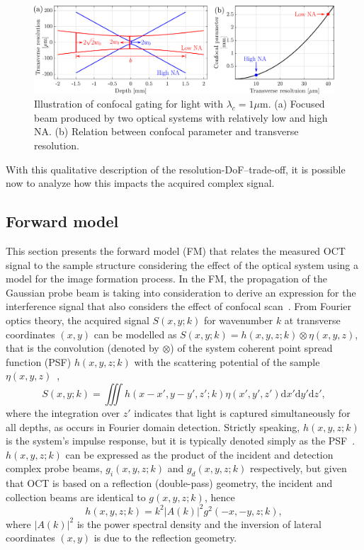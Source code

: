 \begin{figure}[htb!]
    \centering
    \includegraphics[width=\textwidth]{Figures/TheoreticalBasis/ConfocalScan.pdf}
    \caption[Illustration of confocal gating.]{Illustration of confocal gating for light with $\lambda_c = 1\mu$m. (a) Focused beam produced by two optical systems with relatively low and high NA. (b) Relation between confocal parameter and transverse resolution.}
    \label{fig:ConfocalScan}
\end{figure}

With this qualitative description of the resolution-DoF--trade-off, it is possible now to analyze how this impacts the acquired complex signal.

\subsection{Forward model}

This section presents the forward model (FM) that relates the measured OCT signal to the sample structure considering the effect of the optical system using a model for the image formation process. In the FM, the propagation of the Gaussian probe beam is taking into consideration to derive an expression for the interference signal that also considers the effect of confocal scan~\cite{Ralston2006_Inverse, Ralston2006_NonParaxial}. From Fourier optics theory, the acquired signal $S(x,y; k)$ for wavenumber $k$ at transverse coordinates $(x,y)$ can be modelled as $S(x,y; k)= h(x,y,z; k)\otimes\eta(x,y,z)$, that is the convolution (denoted by $\otimes$) of the system coherent point spread function (PSF) $h(x,y,z; k)$ with the scattering potential of the sample $\eta(x,y,z)$~\cite{Davis2007_Nonparaxial},
\begin{equation}\label{eq:conv}
    S(x,y; k) = \iiint h(x-x', y-y', z'; k) \eta(x',y',z') \text{d}x' \text{d}y' \text{d}z',
\end{equation}
where the integration over $z'$ indicates that light is captured simultaneously for all depths, as occurs in Fourier domain detection. Strictly speaking, $h(x,y,z; k)$ is the system's impulse response, but it is typically denoted simply as the PSF~\cite{Adie2015_Interferometric}. $h(x,y,z; k)$ can be expressed as the product of the incident and detection complex probe beams, $g_i(x,y,z;k)$ and $g_d(x,y,z;k)$ respectively, but given that OCT is based on a reflection (double-pass) geometry, the incident and collection beams are identical to $g(x,y,z;k)$, hence~\cite{Ralston2006_Inverse}
\begin{equation}\label{eq:PSF1}
    h(x,y,z; k) =k^2|A(k)|^2g^2(-x, -y, z; k),
\end{equation}
where $|A(k)|^2$ is the power spectral density and the inversion of lateral coordinates $(x,y)$ is due to the reflection geometry.

